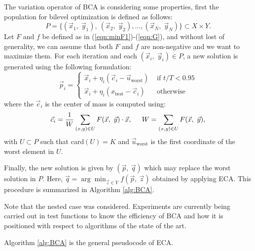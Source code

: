\documentclass[conference]{IEEEtran}
\begin{document}
The variation operator of BCA is considering some properties, first
the population for bilevel optimization is defined as follows: 
$$
    P = \{ (\vec{x}_1,\; \vec{y}_1), \ (\vec{x}_2,\; \vec{y}_2), \ldots,
           (\vec{x}_N,\; \vec{y}_N)
         \}
         \subset X \times Y .
$$
% 
Let $F$ and $f$ be defined as in (\ref{eqn:minF1})-(\ref{eqn:G}), and without lost 
of generality, we can assume that both $F$ and $f$ are  non-negative and we want to maximize them. For each iteration and each $(\vec{x}_i,\; \vec{y}_i) \in P$, a new solution is generated using the following formulation:
% 
\begin{equation}
    \vec{p}_i = 
    \begin{cases}
        \vec{x}_i + \eta _{i} ( \vec{c}_i - \vec{u}_{ \text{worst} } ) 
               & \text{ if } t/T < 0.95 \\
        \vec{x}_i + \eta _{i} ( x_{\text{best}} - \vec{c}_i)
               & \text{ otherwise}
    \end{cases}
    \label{eqn:vcu2F}
\end{equation}
% 
%
where the $\vec{c}_i$ is the center of mass is computed using:
%
\begin{equation}
    \vec{c}_i = \dfrac{1} {W} \sum_{(x,y) \in U} F(\vec{x},\ \vec{y}) \cdot \vec{x} , 
            \hspace{0.5cm} 
            W = \sum_{ (x,y) \in U} F(\vec{x},\ \vec{y}),
    \label{eqn:centerF}
\end{equation} 
% 
with $U \subset P $ such that card$(U) = K$  and $\vec{u}_{ \text{worst}}$ is the first coordinate of the worst element in $U$.

Finally, the new solution is given by $ (\vec{p}, \ \vec{q}) $ which may 
replace the worst solution in $ P $. Here,
$  \vec{q} = \arg \min _ {\vec{z} \in Y} f (\vec{p}, \ \vec{z}) $ obtained
by applying ECA. This procedure is summarized in Algorithm \ref{alg:BCA}.

Note that the nested case was considered. Experiments are currently being carried out in test functions to know the efficiency of BCA and how it is positioned with respect to algorithms of the state of the art.
% 

Algorithm \ref{alg:BCA} is the general pseudocode of ECA.
\end{document}
